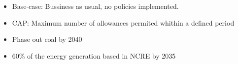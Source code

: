 \documentclass[11pt, letterpaper]{article}
\begin{document}
\begin{itemize}
    \item Base-case: Bussiness as usual, no policies implemented. 
    \item CAP: Maximum number of allowances permited whithin a defined period
    
    \item Phase out coal by 2040
    
    \item 60\% of the energy generation based in NCRE by 2035

\end{itemize}


\end{document}
